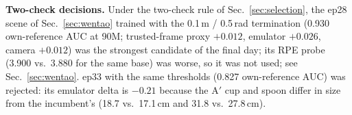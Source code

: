 \textbf{Two-check decisions.} Under the two-check rule of Sec.~\ref{sec:selection}, the ep28 scene
of Sec.~\ref{sec:wentao} trained with the 0.1\,m / 0.5\,rad termination (0.930 own-reference AUC
at 90M; trusted-frame proxy $+0.012$, emulator $+0.026$, camera $+0.012$) was the strongest
candidate of the final day; its RPE probe (3.900 vs.\ 3.880 for the same base) was worse, so it was
not used; see Sec.~\ref{sec:wentao}. ep33 with
the same thresholds (0.827 own-reference AUC) was rejected: its emulator delta is $-0.21$ because
the A$'$ cup and spoon differ in size from the incumbent's (18.7 vs.\ 17.1\,cm and 31.8 vs.\
27.8\,cm).
